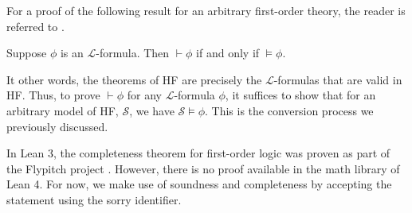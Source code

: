 For a proof of the following result for an arbitrary first-order theory, 
the reader is referred to  \cite{shoenfield1967mathematical}.

\begin{theorem}
    \label{thm:completeness}
    \leanok
    Suppose $\phi$ is an $\mathcal{L}$-formula.
    Then $\vdash \phi$ if and only if $\vDash \phi$.
\end{theorem}

It other words, the theorems of HF are precisely the $\mathcal{L}$-formulas that are valid in HF.
Thus, to prove $\vdash \phi$ for any $\mathcal{L}$-formula $\phi$, it suffices to show that for an 
arbitrary model of HF, $\mathcal{S}$, we have $\mathcal{S} \vDash \phi$.
This is the conversion process we previously discussed.

In Lean 3, the completeness theorem for first-order logic was proven as part of the Flypitch project
\cite{han2020formal}.
However, there is no proof available in the math library of Lean 4.
For now, we make use of soundness and completeness by accepting the statement 
using the {\ttfamily \small sorry} identifier. 